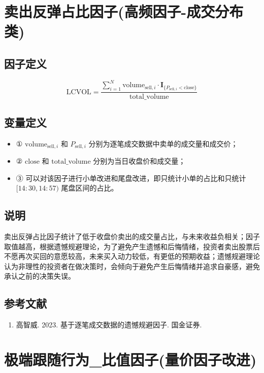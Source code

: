 \documentclass{article}
\begin{document}
\section{卖出反弹占比因子(高频因子-成交分布类)}

\subsection{因子定义}
\begin{equation}
    \mathrm{LCVOL} = \frac{\sum_{i=1}^{N} \mathrm{volume}_{\mathrm{sell},i} \cdot \mathbf{I}_{\{P_{\mathrm{sell},i} < \mathrm{close}\}}}{\mathrm{total\_volume}}
\end{equation}

\subsection{变量定义}
\begin{itemize}
    \item ① \( \mathrm{volume}_{\mathrm{sell},i} \) 和 \( P_{\mathrm{sell},i} \) 分别为逐笔成交数据中卖单的成交量和成交价；
    \item ② \( \mathrm{close} \) 和 \( \mathrm{total\_volume} \) 分别为当日收盘价和成交量；
    \item ③ 可以对该因子进行小单改进和尾盘改进，即只统计小单的占比和只统计 \([14:30,14:57)\) 尾盘区间的占比。
\end{itemize}

\subsection{说明}
卖出反弹占比因子统计了低于收盘价卖出的成交量占比，与未来收益负相关；因子取值越高，根据遗憾规避理论，为了避免产生遗憾和后悔情绪，投资者卖出股票后不愿再次买回的意愿较高，未来买入动力较低，有更低的预期收益；遗憾规避理论认为非理性的投资者在做决策时，会倾向于避免产生后悔情绪并追求自豪感，避免承认之前的决策失误。

\subsection{参考文献}
\begin{enumerate}
    \item 高智威. 2023. 基于逐笔成交数据的遗憾规避因子. 国金证券.
\end{enumerate}

\section{极端跟随行为\_比值因子(量价因子改进)}
\end{document}
